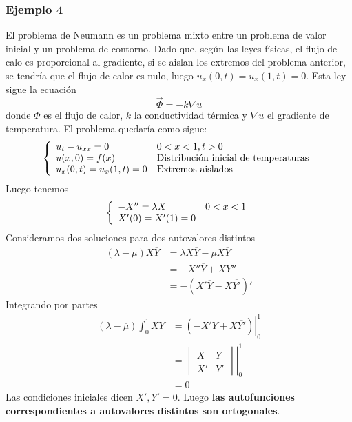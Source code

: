 \subsubsection*{Ejemplo 4}
El problema de Neumann es un problema mixto entre un problema de valor inicial y un problema de contorno. Dado que, según las leyes físicas, el flujo de calo es proporcional al gradiente, si se aislan los extremos del problema anterior, se tendría que el flujo de calor es nulo, luego $u_x(0,t)=u_x(1,t) = 0$. 
Esta ley sigue la ecuación
$$\vec{\Phi} = -k\nabla u$$
donde $\Phi$ es el flujo de calor, $k$ la conductividad térmica y $\nabla u$ el gradiente de temperatura.
El problema quedaría como sigue:
\begin{equation*}
\left\{
\begin{array}{l l}
u_t-u_{xx}=0 & 0<x<1, t>0\\
u(x,0)=f(x)& \text{Distribución inicial de temperaturas}\\
u_x(0,t)=u_x(1,t) = 0 & \text{Extremos aislados}
\end{array}
\right.
\end{equation*}
Luego tenemos
\begin{equation*}
\left\{
\begin{array}{l l}
-X''=\lambda X & 0<x<1\\
X'(0)=X'(1)=0
\end{array}
\right.
\end{equation*}
Consideramos dos soluciones para dos autovalores distintos
\begin{align*}
(\lambda-\overline{\mu})X\overline{Y} & = \lambda X\overline{Y}-\overline{\mu}X\overline{Y}\\
& = -X''\overline{Y}+X\overline{Y''}\\
& =-(X'\overline{Y}-X\overline{Y'})'
\end{align*}
Integrando por partes
\begin{align*}
(\lambda - \overline{\mu})\int_0^1X\overline{Y} & = \left.(-X'\overline{Y}+X\overline{Y'})\right|_0^1 \\
& =  \left.\begin{vmatrix}X & \overline{Y}\\X' & \overline{Y'}\end{vmatrix}\right|_0^1\\ & = 0
\end{align*}
Las condiciones iniciales dicen $X', Y' = 0$. Luego \textbf{las autofunciones correspondientes a autovalores distintos son ortogonales}.

